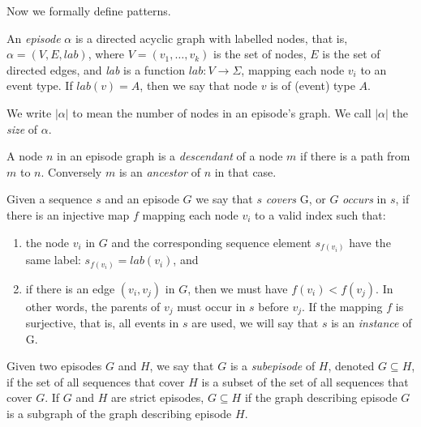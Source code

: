 Now we formally define patterns.

\begin{definition}
An \emph{episode} $ \alpha $ is a directed acyclic graph with labelled nodes, that is, $ \alpha = (V, E, lab) $, where $ V = (v_1, \ldots, v_k) $ is the set of nodes, $ E $ is the set of directed edges, and \emph{lab} is a function $ lab \colon V \rightarrow \Sigma $, mapping each node $ v_i $ to an event type. If $ lab(v) = A $, then we say that node $ v $ is of (event) type $ A $.
\end{definition}

We write $ | \alpha | $ to mean the number of nodes in an episode's graph. We call $ | \alpha | $ the \emph{size} of $ \alpha $.

\begin{definition}
A node $ n $ in an episode graph is a \emph{descendant} of a node $ m $ if there is a path from $ m $ to $ n $. Conversely $ m $ is an \emph{ancestor} of $ n $ in that case.
\end{definition}

\begin{definition}
Given a sequence $ s $ and an episode $ G $ we say that $ s $ \emph{covers} G, or $ G $ \emph{occurs} in $ s $, if there is an injective map $ f $ mapping each node $ v_i $ to a valid index such that:
\begin{enumerate}
\item the node $ v_i $ in $ G $ and the corresponding sequence element $ s_{f(v_i)} $ have the same label: $ s_{f(v_i)} = lab(v_i) $, and
\item if there is an edge $ (v_i, v_j) $ in $ G $, then we must have $ f(v_i) < f(v_j) $. In other words, the parents of $ v_j $ must occur in $ s $ before $ v_j $. If the mapping $ f $ is surjective, that is, all events in $ s $ are used, we will say that $ s $ is an \emph{instance} of G.
\end{enumerate}
\end{definition}

\begin{definition}
Given two episodes $ G $ and $ H $, we say that $ G $ is a \emph{subepisode} of $ H $, denoted $ G \subseteq H $, if the set of all sequences that cover $ H $ is a subset of the set of all sequences that cover $ G $. If $ G $ and $ H $ are strict episodes, $ G \subseteq H $ if the graph describing episode $ G $ is a subgraph of the graph describing episode $ H $.
\end{definition}

